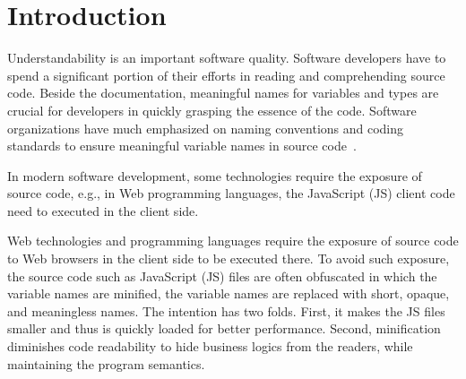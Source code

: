 \section{Introduction}
\label{intro:sec}

Understandability is an important software quality. Software
developers have to spend a significant portion of their efforts in
reading and comprehending source code. Beside the documentation,
meaningful names for variables and types are crucial for developers in
quickly grasping the essence of the code. Software organizations have
much emphasized on naming conventions and coding standards to ensure
meaningful variable names in source
code~\cite{barr-codeconvention-fse14}.



In modern software development, some technologies require the exposure
of source code, e.g., in Web programming languages, the JavaScript
(JS) client code need to executed in the client side.

Web technologies and programming languages require the exposure of
source code to Web browsers in the client side to be executed
there. To avoid such exposure, the source code such as JavaScript (JS)
files are often obfuscated in which the variable names are minified,
\ie the variable names are replaced with short, opaque, and
meaningless names. The intention has two folds. First, it makes the JS
files smaller and thus is quickly loaded for better performance.
Second, minification diminishes code readability to hide business
logics from the readers, while maintaining the program semantics.
%
%


